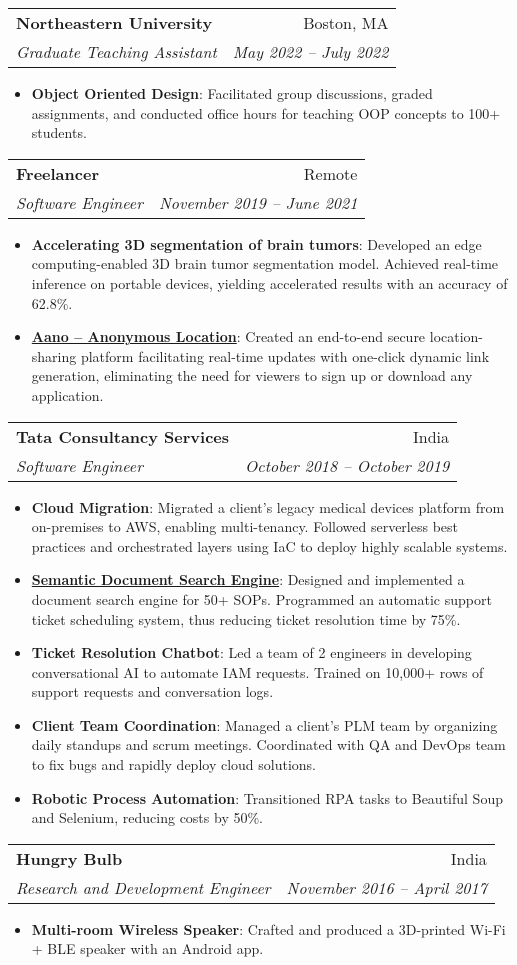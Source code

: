 \documentclass[letterpaper,10pt]{article}
\makeatletter
\newcommand{\resumeItem}[2]{
    \item\small{
        \textbf{#1}{: #2 \vspace{-2pt}}
    }
}
\newcommand{\resumeSubheading}[4]{
    \vspace{-1pt}\item
    \begin{tabular*}{0.97\textwidth}{l@{\extracolsep{\fill}}r}
        \textbf{#1}       & #2                 \\
        \textit{\small#3} & \textit{\small #4} \\
    \end{tabular*}\vspace{-5pt}
}
\newcommand{\resumeSubItem}[2]{\resumeItem{#1}{#2}\vspace{-4pt}}
\newcommand{\resumeItemListStart}{\begin{itemize}}
\newcommand{\resumeItemListEnd}{\end{itemize}\vspace{-5pt}}
\makeatother
\begin{document}
	\resumeSubheading
	{Northeastern University}{Boston, MA}
	{Graduate Teaching Assistant}{May 2022 -- July 2022}
	\resumeItemListStart
		\resumeItem{Object Oriented Design}
			{Facilitated group discussions, graded assignments, and conducted office hours for teaching OOP concepts to 100+ students.}
	\resumeItemListEnd
	
	\resumeSubheading
	{Freelancer}{Remote}
	{Software Engineer}{November 2019 -- June 2021}
	\resumeItemListStart
		\resumeSubItem{Accelerating 3D segmentation of brain tumors}
			{Developed an edge computing-enabled 3D brain tumor segmentation model. Achieved real-time inference on portable devices, yielding accelerated results with an accuracy of 62.8\%.}
		\resumeItem{\href{https://github.com/chakrabortyde/aano}{Aano -- Anonymous Location}}
			{Created an end-to-end secure location-sharing platform facilitating real-time updates with one-click dynamic link generation, eliminating the need for viewers to sign up or download any application.}
	\resumeItemListEnd
	
	\resumeSubheading
	{Tata Consultancy Services}{India}
	{Software Engineer}{October 2018 -- October 2019}
	\resumeItemListStart
		\resumeItem{Cloud Migration}
			{Migrated a client’s legacy medical devices platform from on-premises to AWS, enabling multi-tenancy. Followed serverless best practices and orchestrated layers using IaC to deploy highly scalable systems.}
		\resumeItem{\href{https://github.com/chakrabortyde/document-search-engine}{Semantic Document Search Engine}}
			{Designed and implemented a document search engine for 50+ SOPs. Programmed an automatic support ticket scheduling system, thus reducing ticket resolution time by 75\%.}
		\resumeItem{Ticket Resolution Chatbot}
			{Led a team of 2 engineers in developing conversational AI to automate IAM requests. Trained on 10,000+ rows of support requests and conversation logs.}
		\resumeItem{Client Team Coordination}
			{Managed a client’s PLM team by organizing daily standups and scrum meetings. Coordinated with QA and DevOps team to fix bugs and rapidly deploy cloud solutions.}
		\resumeItem{Robotic Process Automation}
			{Transitioned RPA tasks to Beautiful Soup and Selenium, reducing costs by 50\%.}
	\resumeItemListEnd
	
	\resumeSubheading
	{Hungry Bulb}{India}
	{Research and Development Engineer}{November 2016 -- April 2017}
	\resumeItemListStart
		\resumeItem{Multi-room Wireless Speaker}
			{Crafted and produced a 3D-printed Wi-Fi + BLE speaker with an Android app.}
	\resumeItemListEnd
	
\end{document}

